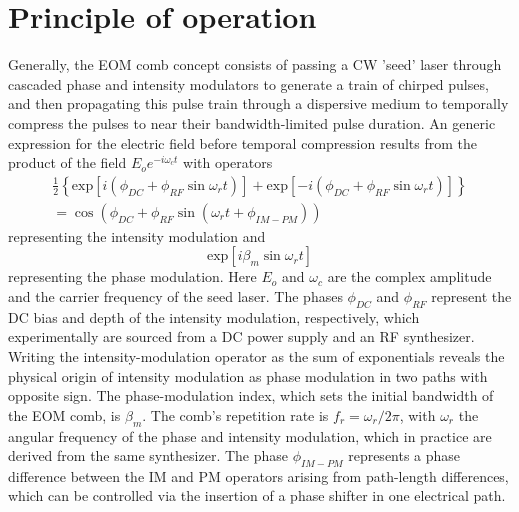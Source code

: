 \section{Principle of operation}
Generally, the EOM comb concept consists of passing a CW 'seed' laser through cascaded phase and intensity modulators to generate a train of chirped pulses, and then propagating this pulse train through a dispersive medium to temporally compress the pulses to near their bandwidth-limited pulse duration. An generic expression for the electric field before temporal compression results from the product of the field $E_oe^{-i\omega_ct}$ with operators
\begin{align} \frac{1}{2}\left\{\mathrm{exp}\left[i(\phi_{DC}+\phi_{RF}\sin{\omega_rt})\right]+\mathrm{exp}\left[-i(\phi_{DC}+\phi_{RF}\sin{\omega_rt})\right]\right\}\\
=\cos\left(\phi_{DC}+\phi_{RF} \sin(\omega_rt+\phi_{IM-PM})\right)
\end{align} representing the intensity modulation and 
\begin{equation}
\mathrm{exp}\left[i\beta_m \sin{\omega_r t}\right]
\end{equation} representing the phase modulation. Here $E_o$ and $\omega_c$ are the complex amplitude and the carrier frequency of the seed laser. The phases  $\phi_{DC}$ and $\phi_{RF}$ represent the DC bias and depth of the intensity modulation, respectively, which experimentally are sourced from a DC power supply and an RF synthesizer. Writing the intensity-modulation operator as the sum of exponentials reveals the physical origin of intensity modulation as phase modulation in two paths with opposite sign. The phase-modulation index, which sets the initial bandwidth of the EOM comb, is $\beta_m$. The comb's repetition rate is $f_r=\omega_r/2\pi$, with $\omega_r$ the angular frequency of the phase and intensity modulation, which in practice are derived from the same synthesizer. The phase $\phi_{IM-PM}$ represents a phase difference between the IM and PM operators arising from path-length differences, which can be controlled via the insertion of a phase shifter in one electrical path. 

